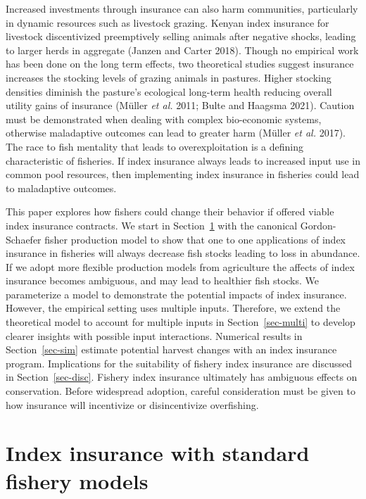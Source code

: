 \documentclass[
  letterpaper,
  DIV=11,
  numbers=noendperiod]{scrartcl}
\theoremstyle{plain}
\theoremstyle{plain}
\theoremstyle{remark}
\begin{document}
Increased investments through insurance can also harm communities,
particularly in dynamic resources such as livestock grazing. Kenyan
index insurance for livestock discentivized preemptively selling animals
after negative shocks, leading to larger herds in aggregate (Janzen and
Carter 2018). Though no empirical work has been done on the long term
effects, two theoretical studies suggest insurance increases the
stocking levels of grazing animals in pastures. Higher stocking
densities diminish the pasture's ecological long-term health reducing
overall utility gains of insurance (Müller \emph{et al.} 2011; Bulte and
Haagsma 2021). Caution must be demonstrated when dealing with complex
bio-economic systems, otherwise maladaptive outcomes can lead to greater
harm (Müller \emph{et al.} 2017). The race to fish mentality that leads
to overexploitation is a defining characteristic of fisheries. If index
insurance always leads to increased input use in common pool resources,
then implementing index insurance in fisheries could lead to maladaptive
outcomes.

This paper explores how fishers could change their behavior if offered
viable index insurance contracts. We start in Section~\ref{sec-common}
with the canonical Gordon-Schaefer fisher production model to show that
one to one applications of index insurance in fisheries will always
decrease fish stocks leading to loss in abundance. If we adopt more
flexible production models from agriculture the affects of index
insurance becomes ambiguous, and may lead to healthier fish stocks. We
parameterize a model to demonstrate the potential impacts of index
insurance. However, the empirical setting uses multiple inputs.
Therefore, we extend the theoretical model to account for multiple
inputs in Section~\ref{sec-multi} to develop clearer insights with
possible input interactions. Numerical results in Section~\ref{sec-sim}
estimate potential harvest changes with an index insurance program.
Implications for the suitability of fishery index insurance are
discussed in Section~\ref{sec-disc}. Fishery index insurance ultimately
has ambiguous effects on conservation. Before widespread adoption,
careful consideration must be given to how insurance will incentivize or
disincentivize overfishing.

\hypertarget{sec-common}{%
\section{Index insurance with standard fishery
models}\label{sec-common}}
\end{document}
